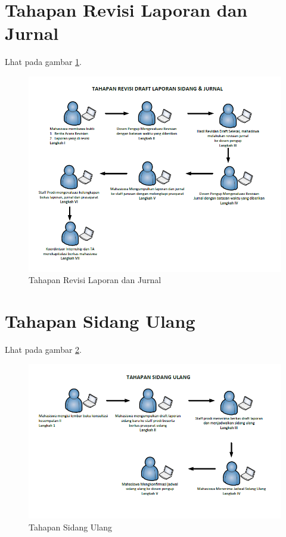 \section{Tahapan Revisi Laporan dan Jurnal}
Lhat pada gambar \ref{figure:P31}.
\begin{figure}[ht]
	\centerline{\includegraphics[width=1\textwidth]{figures/revisi.png}}
	\caption{Tahapan Revisi Laporan dan Jurnal}
	\label{figure:P31}
	\end{figure}
\section{Tahapan Sidang Ulang}
Lhat pada gambar \ref{figure:P4}.
\begin{figure}[ht]
	\centerline{\includegraphics[width=1\textwidth]{figures/ulang.png}}
	\caption{Tahapan Sidang Ulang}
	\label{figure:P4}
	\end{figure}
